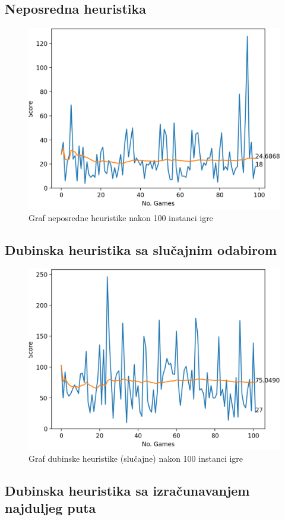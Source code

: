 \documentclass[zavrsnirad]{fer}
\begin{document}
\subsection{Neposredna heuristika}
\label{pog:neposredna}


\begin{figure}[htb]
	\centering
	\includegraphics[width=0.68\linewidth]{Figures/sofort.png} 
	\caption{Graf neposredne heuristike nakon 100 instanci igre}
	\label{slk:sofort_graph}
\end{figure}


\subsection{Dubinska heuristika sa slučajnim odabirom}
\label{pog:dubinska_slucajna}



\begin{figure}[htb]
	\centering
	\includegraphics[width=0.68\linewidth]{Figures/reach.png} 
	\caption{Graf dubinske heuristike (slučajne) nakon 100 instanci igre}
	\label{slk:reach_graph}
\end{figure}


\subsection{Dubinska heuristika sa izračunavanjem najduljeg puta}
\label{pog:dubinska}
\end{document}
